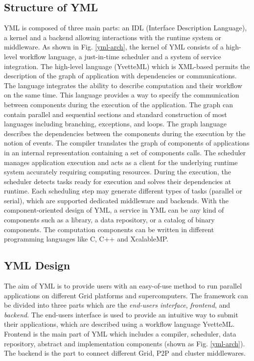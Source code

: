 \subsection{Structure of YML}

YML is composed of three main parts: an IDL (Interface Description Language), a kernel and a backend allowing interactions with the runtime system or middleware. As shown in Fig. \ref{yml-arch}, the kernel of YML consists of a high-level workflow language, a just-in-time scheduler and a system of service integration. The high-level language (YvetteML) which is XML-based permits the description of the graph of application with dependencies or communications. The language integrates the ability to describe computation and their workflow on the same time. This language provides a way to specify the communication between components during the execution of the application. The graph can contain parallel and sequential sections and standard construction of most languages including branching, exceptions, and loops. The graph language describes the dependencies between the components during the execution by the notion of events. The compiler translates the graph of components of applications in an internal representation containing a set of components calls. The scheduler manages application execution and acts as a client for the underlying runtime system accurately requiring computing resources. During the execution, the scheduler detects tasks ready for execution and solves their dependencies at runtime. Each scheduling step may generate different types of tasks (parallel or serial), which are supported dedicated middleware and backends. With the component-oriented design of YML, a service in YML can be any kind of components such as a library, a data repository, or a catalog of binary components. The computation components can be written in different programming languages like C, C++ and XcalableMP. 

\subsection{YML Design}

The aim of YML is to provide users with an easy-of-use method to run parallel applications on different Grid platforms and supercomputers. The framework can be divided into three parts which are the \textit{end-users interface}, \textit{frontend}, and \textit{backend}. The end-users interface is used to provide an intuitive way to submit their applications, which are described using a workflow language YvetteML. Frontend is the main part of YML which includes a compiler, scheduler, data repository, abstract and implementation components (shown as Fig. \ref{yml-arch}). The backend is the part to connect different Grid, P2P and cluster middlewares.

